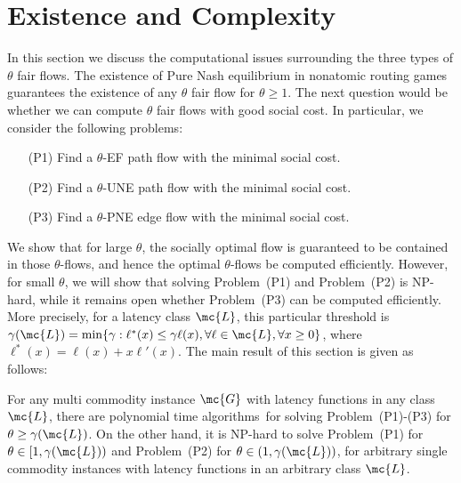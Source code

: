\section{Existence and Complexity}\label{sec:complex}
In this section we discuss the computational issues surrounding the three types of $\theta$ fair flows. The existence of Pure Nash equilibrium in nonatomic routing games guarantees the existence of any $\theta$ fair flow for $\theta\geq 1$. The next question would be whether we can compute $\theta$ fair flows with good social cost.  In particular, we consider the following problems:
\begin{enumerate}
	\item[(P1)] Find a $\theta$-EF path flow with the minimal social cost.
	\item[(P2)] Find a $\theta$-UNE path flow with the minimal social cost.
	\item[(P3)] Find a $\theta$-PNE edge flow with the minimal social cost.
\end{enumerate}
We show that for large $\theta$, the socially optimal flow is guaranteed to be contained in those $\theta$-flows, and hence the optimal $\theta$-flows be computed efficiently.  However, for small $\theta$, we will show that solving Problem~(P1) and Problem~(P2) is NP-hard, while it remains open whether Problem~(P3) can be computed efficiently.  
More precisely, for a latency class $\mc{L}$, this particular threshold is $\gamma(\mc{L})= \min\{\gamma: \ell^{*}(x)\leq \gamma \ell(x), \forall \ell\in \mc{L}, \forall x\geq 0\}$, where $\ell^{*}(x)= \ell(x)+x\ell'(x)$.  The main result of this section is given as follows:
\begin{theorem}
	For any multi commodity instance $\mc{G}$ 
	with latency functions in any class $\mc{L}$, there are polynomial time algorithms\footnotemark $\, $  for solving Problem~(P1)-(P3) 
	for $\theta \ge \gamma(\mc{L})$. %
	On the other hand, it is NP-hard to solve Problem~(P1) for $\theta \in [1, \gamma(\mc{L}))$ and Problem~(P2) for $\theta \in (1, \gamma(\mc{L}))$, for  arbitrary single commodity instances %
	with latency functions in an arbitrary class $\mc{L}$.
	\label{thm:main_hardness}
\end{theorem} 






